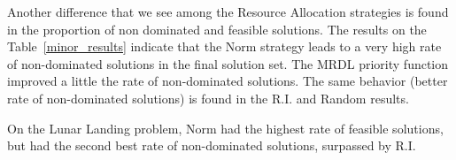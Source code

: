 Another difference that we see among the Resource Allocation strategies is found in the proportion of non dominated and feasible solutions. The results on the Table~\ref{minor_results} indicate that the Norm strategy leads to a very high rate of non-dominated solutions in the final solution set. The MRDL priority function improved a little the rate of non-dominated solutions. The same behavior (better rate of non-dominated solutions) is found in the R.I. and Random results.

On the Lunar Landing problem, Norm had the highest rate of feasible solutions, but had the second best rate of non-dominated solutions, surpassed by R.I.



















